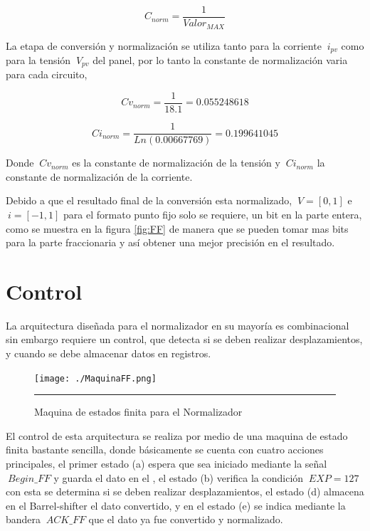 \begin{equation} \label{eq:ej1}
  C_{norm}
  = \frac{1}{Valor_{MAX}}  
\end{equation}  

La etapa de conversión y normalización se utiliza tanto para la corriente $\ i_{pv} $ como para la tensión $\ V_{pv} $ del panel, por lo tanto la constante de normalización varia para cada circuito,  
  
\begin{equation} \label{eq:ej2}
  Cv_{norm}
  = \frac{1}{18.1} = 0.055248618  
\end{equation}

\begin{equation} \label{eq:ej3}
  Ci_{norm}
  = \frac{1}{Ln\left(0.00667769\right)} = 0.199641045  
\end{equation}
 
 Donde $\ Cv_{norm}$ es la constante de normalización de la tensión y $\ Ci_{norm}$ la constante de normalización de la corriente. 
 
 Debido a que el resultado final de la conversión esta normalizado, $\ V = [0,1]$ e $\ i = [-1,1]$ para el formato punto fijo solo se requiere, un bit en la parte entera, como se muestra en la figura \ref{fig:FF} de manera que se pueden tomar mas bits para la parte fraccionaria y así obtener una mejor precisión en el resultado. 
 
\section{Control}

La arquitectura diseñada para el normalizador en su mayoría es combinacional sin embargo requiere un control, que detecta si se deben realizar  desplazamientos, y cuando se debe almacenar datos en registros. 

  \begin{figure}[H]
  \centering
    \texttt{[image: ./MaquinaFF.png]}
    \rule{35em}{0.5pt}
  \caption[Control del normalizador]{Maquina de estados finita para el Normalizador}
  \label{fig:CTRLNORM}
\end{figure} 

El control de esta arquitectura se realiza por medio de una maquina de estado finita bastante sencilla, donde básicamente se cuenta con cuatro acciones principales, el primer estado (a) espera que sea iniciado mediante la señal $\ Begin\_FF$ y guarda el dato en el , el estado (b) verifica la condición $\ EXP=127 $ con esta se determina si se deben realizar desplazamientos, el estado (d) almacena en el Barrel-shifter el dato convertido, y en el estado (e) se indica mediante la bandera $\ ACK\_FF$ que el dato ya fue convertido y normalizado.


